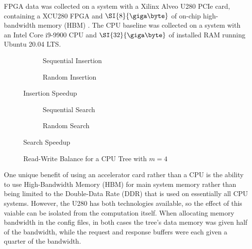 
FPGA data was collected on a system with a Xilinx Alveo U280 PCIe card,
containing a XCU280 FPGA and $\SI{8}{\giga\byte}$ of on-chip high-bandwidth
memory (HBM) \autocite{u280}. The CPU baseline was collected on a system with an
Intel Core i9-9900 CPU and $\SI{32}{\giga\byte}$ of installed RAM running Ubuntu
20.04 LTS.




\begin{figure}[H]
	\centering
	\begin{subfigure}{7.5cm}
		\centering
		
		\caption{Sequential Insertion}
		\label{fig:fpga-sequential-insert}
	\end{subfigure}
	\begin{subfigure}{7.5cm}
		\centering
		
		\caption{Random Insertion}
		\label{fig:fpga-random-insert}
	\end{subfigure}
	\caption{Insertion Speedup}
	\label{fig:insert-speedup}
\end{figure}

\begin{figure}[H]
	\centering
	\begin{subfigure}{7.5cm}
		\centering
		
		\caption{Sequential Search}
		\label{fig:fpga-sequential-search}
	\end{subfigure}
	\begin{subfigure}{7.5cm}
		\centering
		
		\caption{Random Search}
		\label{fig:fpga-random-search}
	\end{subfigure}
	\caption{Search Speedup}
	\label{fig:search-speedup}
\end{figure}



\begin{figure}[H]
	\centering
	
	\caption{Read-Write Balance for a CPU Tree with $m=4$}
	\label{fig:rw-balance}
\end{figure}



One unique benefit of using an accelerator card rather than a CPU is the ability
to use High-Bandwidth Memory (HBM) for main system memory rather than being
limited to the Double-Data Rate (DDR) that is used on essentially all CPU
systems. However, the U280 has both technologies available, so the effect of
this vaiable can be isolated from the computation itself. When allocating memory
bandwidth in the config files, in both cases the tree's data memory was given
half of the bandwidth, while the request and response buffers were each given a
quarter of the bandwidth.

